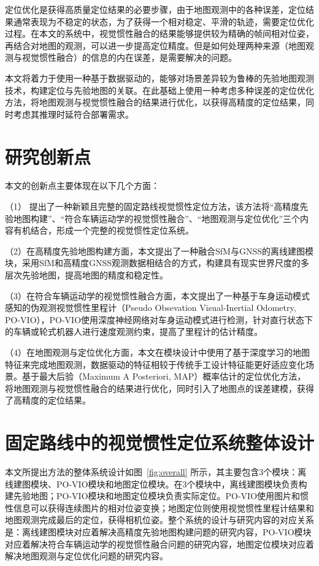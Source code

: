 定位优化是获得高质量定位结果的必要步骤，由于地图观测中的各种误差，定位结果通常表现为不稳定的状态，为了获得一个相对稳定、平滑的轨迹，需要定位优化过程。在本文的系统中，视觉惯性融合的结果能够提供较为精确的帧间相对位姿，再结合对地图的观测，可以进一步提高定位精度。但是如何处理两种来源（地图观测与视觉惯性融合）的信息的内在误差，是需要解决的问题。

本文将着力于使用一种基于数据驱动的，能够对场景差异较为鲁棒的先验地图观测技术，构建定位与先验地图的关联。在此基础上使用一种考虑多种误差的定位优化方法，将地图观测与视觉惯性融合的结果进行优化，以获得高精度的定位结果，同时考虑其推理时延符合部署需求。

\section{研究创新点}
本文的创新点主要体现在以下几个方面：

（1） 提出了一种新颖且完整的固定路线视觉惯性定位方法，该方法将“高精度先验地图构建”、“符合车辆运动学的视觉惯性融合”、“地图观测与定位优化”三个内容有机结合，形成一个完整的视觉惯性定位系统。

（2）在高精度先验地图构建方面，本文提出了一种融合SfM与GNSS的离线建图模块，采用SfM和高精度GNSS观测数据相结合的方式，构建具有现实世界尺度的多层次先验地图，提高地图的精度和稳定性。

（3）在符合车辆运动学的视觉惯性融合方面，本文提出了一种基于车身运动模式感知的伪观测视觉惯性里程计（Pseudo Obsevation Visual-Inertial Odometry, PO-VIO），PO-VIO使用深度神经网络对车身运动模式进行检测，针对直行状态下的车辆或轮式机器人进行速度观测约束，提高了里程计的估计精度。

（4）在地图观测与定位优化方面，本文在模块设计中使用了基于深度学习的地图特征来完成地图观测，数据驱动的特征相较于传统手工设计特征能更好适应变化场景。基于最大后验（Maximum A Posteriori, MAP）概率估计的定位优化方法，将地图观测与视觉惯性融合的结果进行优化，同时引入了地图点的误差建模，获得了高精度的定位结果。

\section{固定路线中的视觉惯性定位系统整体设计}

本文所提出方法的整体系统设计如图~\ref{fig:overall} 所示，其主要包含3个模块：离线建图模块、PO-VIO模块和地图定位模块。在3个模块中，离线建图模块负责构建先验地图；PO-VIO模块和地图定位模块负责实际定位。PO-VIO使用图片和惯性信息可以获得连续图片的相对位姿变换；地图定位则使用视觉惯性里程计结果和地图观测完成最后的定位，获得相机位姿。整个系统的设计与研究内容的对应关系是：离线建图模块对应着解决高精度先验地图构建问题的研究内容，PO-VIO模块对应着解决符合车辆运动学的视觉惯性融合问题的研究内容，地图定位模块对应着解决地图观测与定位优化问题的研究内容。

